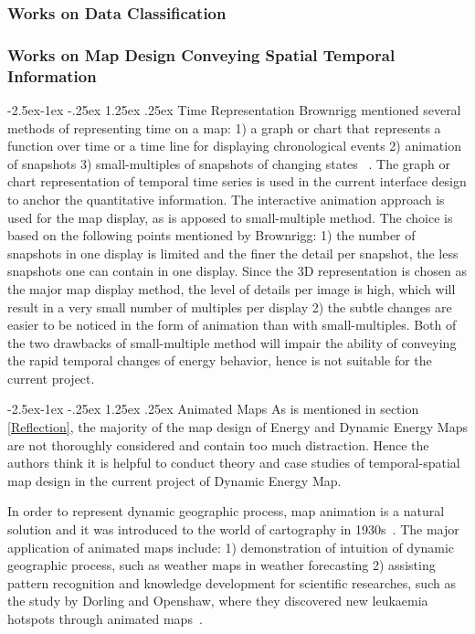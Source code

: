 \documentclass[hidelinks,12pt]{article}
\makeatletter
\renewcommand\paragraph{\@startsection{paragraph}{4}{\z@}%
            {-2.5ex\@plus -1ex \@minus -.25ex}%
            {1.25ex \@plus .25ex}%
            {\normalfont\normalsize\bfseries}}
\makeatother
\begin{document}
\subsubsection{Works on Data Classification}

\subsubsection{Works on Map Design Conveying Spatial Temporal
  Information}
\paragraph{Time Representation}
Brownrigg mentioned several methods of representing time on a map: 1)
a graph or chart that represents a function over time or a time line
for displaying chronological events 2) animation of snapshots 3)
small-multiples of snapshots of changing states
~\cite{Brownrigg2005}. The graph or chart representation of temporal
time series is used in the current interface design to anchor the
quantitative information. The interactive animation approach is used
for the map display, as is apposed to small-multiple method. The
choice is based on the following points mentioned by Brownrigg: 1) the
number of snapshots in one display is limited and the finer the detail
per snapshot, the less snapshots one can contain in one display. Since
the 3D representation is chosen as the major map display method, the
level of details per image is high, which will result in a very small
number of multiples per display 2) the subtle changes are easier to be
noticed in the form of animation than with small-multiples. Both of
the two drawbacks of small-multiple method will impair the ability of
conveying the rapid temporal changes of energy behavior, hence is not
suitable for the current project.

\paragraph{Animated Maps}\label{anime}
As is mentioned in section \ref{Reflection}, the majority of the map
design of Energy and Dynamic Energy Maps are not thoroughly considered
and contain too much distraction. Hence the authors think it is
helpful to conduct theory and case studies of temporal-spatial map
design in the current project of Dynamic Energy Map.

In order to represent dynamic geographic process, map animation is a
natural solution and it was introduced to the world of cartography in
1930s~\cite{Harrower2008}. The major application of animated maps
include: 1) demonstration of intuition of dynamic geographic process,
such as weather maps in weather forecasting 2) assisting pattern
recognition and knowledge development for scientific researches, such
as the study by Dorling and Openshaw, where they discovered new
leukaemia hotspots through animated maps~\cite{Dorling1992}.
\end{document}
